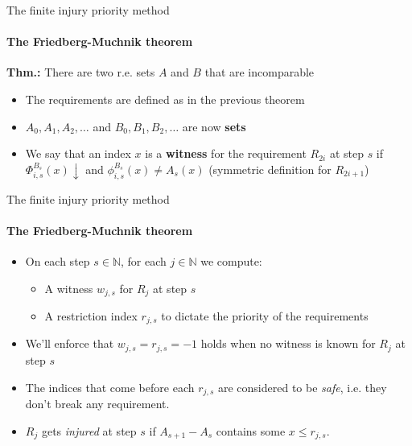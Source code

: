 \documentclass{beamer}
\newcommand{\N}{\mathbb{N}}                     %
\begin{document}
\begin{frame}{The finite injury priority method}
\framesubtitle{The Friedberg-Muchnik theorem}
    \cite{friedberg,muchnik} \textbf{Thm.:} There are two r.e. sets $A$ and $B$ that are incomparable
    \begin{itemize}[<+->]
        \item The requirements are defined as in the previous theorem
        \item $A_0, A_1, A_2, \ldots$ and $B_0, B_1, B_2, \ldots$ are now \textbf{sets}
        \item We say that an index $x$ is a \textbf{witness} for the requirement $R_{2i}$ at step $s$ if $\Phi_{i,s}^{B_s}(x) \downarrow$ and $\phi_{i,s}^{B_s}(x) \neq A_s(x)$ (symmetric definition for $R_{2i+1}$)

    \end{itemize}
\end{frame}

\begin{frame}{The finite injury priority method}
\framesubtitle{The Friedberg-Muchnik theorem}
    \begin{itemize}[<+->]
        \item On each step $s \in \N$, for each $j \in \N$ we compute:
        \begin{itemize}
            \item A witness $w_{j,s}$ for $R_j$ at step $s$
            \item A restriction index $r_{j,s}$ to dictate the priority of the requirements
        \end{itemize}
        \item We'll enforce that $w_{j,s} = r_{j,s} = -1$ holds when no witness is known for $R_j$ at step $s$
        \item The indices that come before each $r_{j,s}$ are considered to be \textit{safe}, i.e. they don't break any requirement.
        \item $R_j$ gets \textit{injured} at step $s$ if $A_{s+1} - A_s$ contains some $x \leq r_{j,s}$.
    \end{itemize}
\end{frame}
\end{document}
